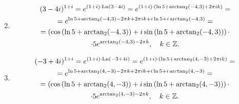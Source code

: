 \begin{solution}
\begin{enumerate}
\begin{multline*}
		\end{multline*}
		\item \begin{multline*}
			(3 - 4i)^{1+i} = e^{(1+i)\cdot\operatorname{Ln}(3-4i)} = e^{(1+i)\cdot(\ln5+\arctan_2(-4,3)+2\pi i k)} = \\
			= e^{\ln5+\arctan_2(-4,3)-2\pi k+2\pi i k + i\ln5+i\arctan_2(-4,3)} = \\
			= \left( \cos\left(\ln5+\arctan_2(-4,3)\right)+i\sin\left(\ln5+\arctan_2(-4,3)\right) \right) \cdot \\
			\cdot 5 e^{\arctan_2(-4,3)-2\pi k}, \quad k \in \mathbb{Z}.
		\end{multline*}
		\item \begin{multline*}
			(-3 + 4i)^{1+i} = e^{(1+i)\cdot\operatorname{Ln}(-3+4i)} = e^{(1+i)\cdot(\ln5+\arctan_2(4,-3)+2\pi i k)} = \\
			= e^{\ln5+\arctan_2(4,-3)-2\pi k+2\pi i k + i\ln5+i\arctan_2(4,-3)} = \\
			= \left( \cos\left(\ln5+\arctan_2(4,-3)\right)+i\sin\left(\ln5+\arctan_2(4,-3)\right) \right) \cdot \\
			\cdot 5 e^{\arctan_2(4,-3)-2\pi k}, \quad k \in \mathbb{Z}.
		\end{multline*}
	\end{enumerate}
\end{solution}

